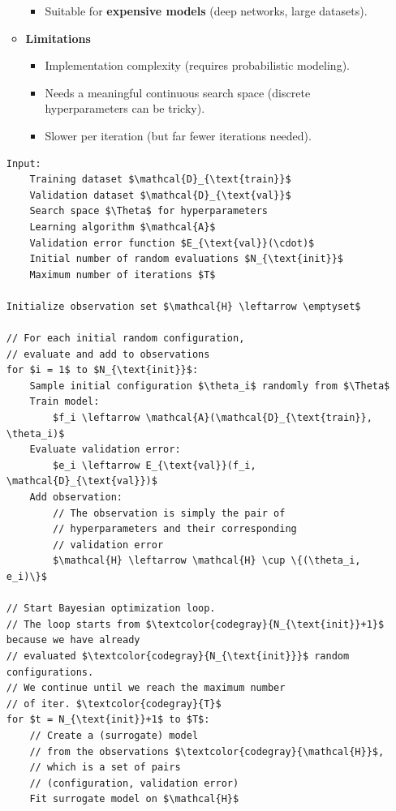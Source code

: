 \begin{enumerate}
\begin{itemize}
\begin{itemize}
            \item[\textcolor{Green3}{\faIcon{check}}] Suitable for \textbf{expensive models} (deep networks, large datasets).
        \end{itemize}
        \item[\textcolor{Red3}{\faIcon{exclamation-triangle}}] \textcolor{Red2}{\textbf{Limitations}}
        \begin{itemize}
            \item[\textcolor{Red2}{\faIcon{times}}] Implementation complexity (requires probabilistic modeling).
            \item[\textcolor{Red2}{\faIcon{times}}] Needs a meaningful continuous search space (discrete hyperparameters can be tricky).
            \item[\textcolor{Red2}{\faIcon{times}}] Slower per iteration (but far fewer iterations needed).
        \end{itemize}
    \end{itemize}
    \begin{lstlisting}[language=pseudo-code,mathescape=true,style={pseudocode-style},caption={Bayesian Optimization for Hyperparameter Tuning}]
Input:
    Training dataset $\mathcal{D}_{\text{train}}$
    Validation dataset $\mathcal{D}_{\text{val}}$
    Search space $\Theta$ for hyperparameters
    Learning algorithm $\mathcal{A}$
    Validation error function $E_{\text{val}}(\cdot)$
    Initial number of random evaluations $N_{\text{init}}$
    Maximum number of iterations $T$

Initialize observation set $\mathcal{H} \leftarrow \emptyset$

// For each initial random configuration,
// evaluate and add to observations
for $i = 1$ to $N_{\text{init}}$:
    Sample initial configuration $\theta_i$ randomly from $\Theta$
    Train model:
        $f_i \leftarrow \mathcal{A}(\mathcal{D}_{\text{train}}, \theta_i)$
    Evaluate validation error:
        $e_i \leftarrow E_{\text{val}}(f_i, \mathcal{D}_{\text{val}})$
    Add observation:
        // The observation is simply the pair of
        // hyperparameters and their corresponding
        // validation error
        $\mathcal{H} \leftarrow \mathcal{H} \cup \{(\theta_i, e_i)\}$

// Start Bayesian optimization loop.
// The loop starts from $\textcolor{codegray}{N_{\text{init}}+1}$ because we have already
// evaluated $\textcolor{codegray}{N_{\text{init}}}$ random configurations.
// We continue until we reach the maximum number
// of iter. $\textcolor{codegray}{T}$
for $t = N_{\text{init}}+1$ to $T$:
    // Create a (surrogate) model
    // from the observations $\textcolor{codegray}{\mathcal{H}}$,
    // which is a set of pairs
    // (configuration, validation error)
    Fit surrogate model on $\mathcal{H}$


\end{lstlisting}
\end{enumerate}

